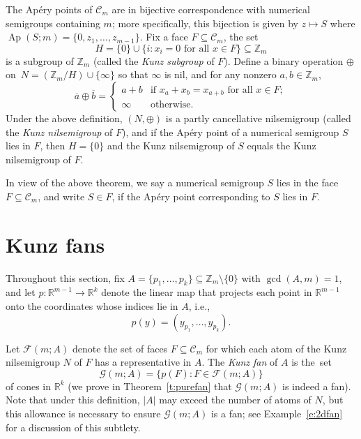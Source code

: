 \documentclass[ALCO, Unicode]{cedram}
\newcommand\ZZ{\mathbb{Z}}
\newcommand\RR{\mathbb{R}}
\newcommand\cC{{\mathcal C}}
\DeclareMathOperator\Ap{Ap}
\begin{document}
\begin{thm}\label{t:kunznilsemigroupface}
The Ap\'ery points of $\cC_m$ are in bijective correspondence with numerical semigroups containing $m$; more specifically, this bijection is given by $z \mapsto S$ where $\Ap(S;m) = \{0, z_1,\ldots, z_{m-1}\}$.  
Fix a face $F \subseteq \cC_m$, the set
$$H = \{0\} \cup \{i : x_i = 0 \text{ for all } x \in F\} \subseteq \ZZ_m$$
is a subgroup of $\ZZ_m$ (called the \emph{Kunz subgroup} of $F$).  Define a binary operation $\oplus$ on~$N = (\ZZ_m/H) \cup \{\infty\}$ so that $\infty$ is nil, and for any nonzero $a,b \in \ZZ_m$,
\[
\overline a \oplus \overline b = \begin{cases}
a+b & \text{if } x_a + x_b = x_{a+b} \text{ for all } x \in F; \\
\infty & \text{otherwise.}
\end{cases}
\]
Under the above definition, $(N, \oplus)$ is a partly cancellative nilsemigroup (called the \emph{Kunz nilsemigroup} of $F$), and if the Ap\'ery point of a numerical semigroup $S$ lies in $F$, then $H = \{0\}$ and the Kunz nilsemigroup of $S$ equals the Kunz nilsemigroup of $F$.  
\end{thm}

In view of the above theorem, we say a numerical semigroup $S$ lies in the face $F \subseteq \cC_m$, and write $S \in F$, if the Ap\'ery point corresponding to $S$ lies in $F$.  


\section{Kunz fans}
\label{sec:kunzfan}

Throughout this section, fix $A = \{p_1, \ldots, p_k\} \subseteq \ZZ_m \setminus \{0\}$ with $\gcd(A, m) = 1$, and let $p:\RR^{m-1} \to \RR^k$ denote the linear map that projects each point in $\RR^{m-1}$ onto the coordinates whose indices lie in $A$, i.e., 
$$p(y) = (y_{p_1}, \ldots, y_{p_k}).$$

\begin{defi}\label{d:kunzfan}
Let $\mathcal F(m;A)$ denote the set of faces $F \subseteq \cC_m$ for which each atom of the Kunz nilsemigroup $N$ of $F$ has a representative in $A$.  
The \emph{Kunz fan} of $A$ is the~set
$$
\mathcal G(m;A) = \{p(F) : F \in \mathcal F(m;A)\}
$$
of cones in $\RR^k$ (we prove in Theorem~\ref{t:purefan} that $\mathcal G(m;A)$ is indeed a fan).  Note that under this definition, $|A|$ may exceed the number of atoms of $N$, but this allowance is necessary to ensure $\mathcal G(m;A)$ is a fan; see Example~\ref{e:2dfan} for a discussion of this subtlety.  
\end{defi}
\end{document}
